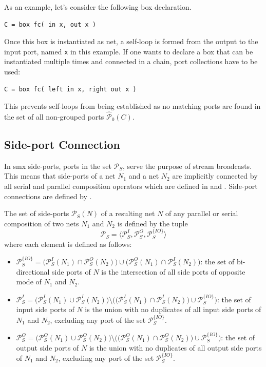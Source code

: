 As an example, let's consider the following box declaration.
\begin{lstlisting}[numbers=none]
C = box fc( in x, out x )
\end{lstlisting}
Once this box is instantiated as net, a self-loop is formed from the output to the input port, named \texttt{x} in this example.
If one wants to declare a box that can be instantiated multiple times and connected in a chain, port collections have to be used:
\begin{lstlisting}[numbers=none]
C = box fc( left in x, right out x )
\end{lstlisting}
This prevents self-loops from being established as no matching ports are found in the set of all non-grouped ports $\hat{\mathcal{P}}_0(C)$.

\subsection{Side-port Connection}
\label{sect_smx_nets_side}
In \gls*{smx} side-ports, \ie ports in the set $\mathcal{P}_S$, serve the purpose of stream broadcasts.
This means that side-ports of a net $N_1$ and a net $N_2$ are implicitly connected by all serial and parallel composition operators which are defined in \Sect{\ref{sect_smx_network_serial}} and \Sect{\ref{sect_smx_network_parallel}}.
Side-port connections are defined by \Def{\ref{def_smx_side}}.
\begin{definition}
    \label{def_smx_side}
    The set of side-ports $\mathcal{P}_S(N)$ of a resulting net $N$ of any parallel or serial composition of two nets $N_1$ and $N_2$ is defined by the tuple
    $$\mathcal{P}_S = \langle \mathcal{P}_S^I, \mathcal{P}_S^O, \mathcal{P}_S^{\{\mathit{IO}\}} \rangle$$
    where each element is defined as follows:
    \begin{itemize}
        \item $\mathcal{P}_S^{\{\mathit{IO}\}} = \big ( \mathcal{P}_S^I(N_1) \cap \mathcal{P}_S^O(N_2) \big ) \cup \big ( \mathcal{P}_S^O(N_1) \cap \mathcal{P}_S^I(N_2) \big )$: the set of bi-directional side ports of $N$ is the intersection of all side ports of opposite mode of $N_1$ and $N_2$.
        \item $\mathcal{P}_S^I = \big ( \mathcal{P}_S^I(N_1) \cup \mathcal{P}_S^I(N_2) \big ) \setminus \Big ( \big ( \mathcal{P}_S^I(N_1) \cap \mathcal{P}_S^I(N_2) \big ) \cup \mathcal{P}_S^{\{\mathit{IO}\}} \Big )$: the set of input side ports of $N$ is the union with no duplicates of all input side ports of $N_1$ and $N_2$, excluding any port of the set $\mathcal{P}_S^{\{\mathit{IO}\}}$.
        \item $\mathcal{P}_S^O = \big ( \mathcal{P}_S^O(N_1) \cup \mathcal{P}_S^O(N_2) \big ) \setminus \Big ( \big ( \mathcal{P}_S^O(N_1) \cap \mathcal{P}_S^O(N_2) \big ) \cup \mathcal{P}_S^{\{\mathit{IO}\}} \Big )$: the set of output side ports of $N$ is the union with no duplicates of all output side ports of $N_1$ and $N_2$, excluding any port of the set $\mathcal{P}_S^{\{\mathit{IO}\}}$.
    \end{itemize}
\end{definition}

